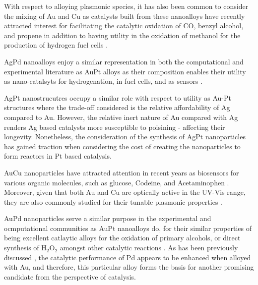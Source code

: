 With respect to alloying plasmonic species, it has also been common to consider the mixing of Au and Cu as catalysts built from these nanoalloys have recently attracted interest for facilitating the catalytic oxidation of CO, benzyl alcohol, and propene \cite{doi:10.1021/cm302097c,doi:10.1021/acsanm.9b00904,D1AY01942B,LLORCA2008187,B817729P,B804362K,DELLAPINA2008384} in addition to having utility in the oxidation of methanol for the production of hydrogen fuel cells \cite{CHANG200955}.

AgPd nanoalloys enjoy a similar representation in both the computational and experimental literature as AuPt alloys as their composition enables their utility as nano-catalsyts for hydrogenation, in fuel cells, and as sensors \cite{Yang2021,ZamoraZeledn2021,Tsuji2014}.

AgPt nanostrucutres occupy a similar role with respect to utility as Au-Pt structures \cite{Li2013,doi:10.1021/acs.nanolett.6b03302} where the trade-off considered is the relative affordability of Ag compared to Au. However, the relative inert nature of Au compared with Ag renders Ag based catalysts more susceptible to poisining - affecting their longevity. Nonetheless, the consideration of the synthesis of AgPt nanoparticles has gained traction when considering the cost of creating the nanoparticles to form reactors in Pt based catalysis.

AuCu nanoparticles have attracted attention in recent years as biosensors for various organic molecules, such as glucose\cite{Liu2021}, Codeine, and Acetaminophen \cite{Allahnouri2022}. Moreover, given that both Au and Cu are optically active in the UV-Vis range, they are also commonly studied for their tunable plasmonic properties \cite{doi:10.1021/jp107637j}.

AuPd nanoparticles serve a similar purpose in the experimental and ocmputational communities as AuPt nanoalloys do, for their similar properties of being excellent catlaytic alloys for the oxidation of primary alcohols, or direct synthesis of H$_{2}$O$_{2}$ amongst other catalytic reactions \cite{Zhu2019,Enache2006,Zhang2011,Agarwal2017}. As has been previously discussed \cite{Zhan2011}, the catalytic performance of Pd appears to be enhanced when alloyed with Au, and therefore, this particular alloy forms the basis for another promising candidate from the perspective of catalysis. 

